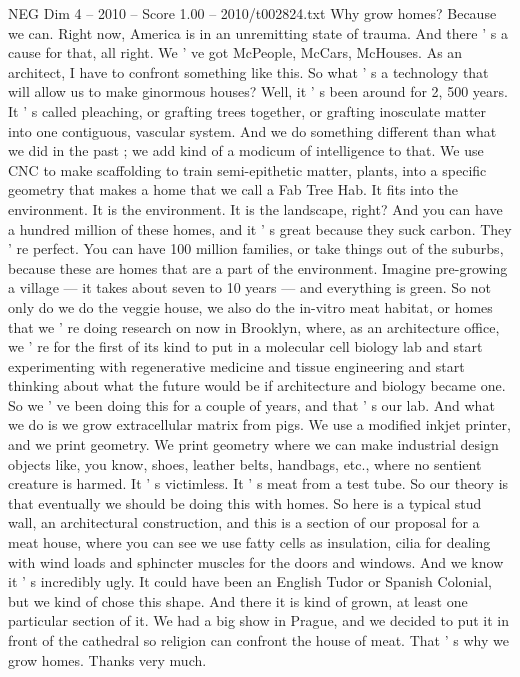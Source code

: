 \begin{textsample}{NEG Dim 4 – 2010 – Score 1.00 – 2010/t002824.txt}  \label{ex:f4_neg_022}
Why grow homes?
Because we can.
Right now, America is in an unremitting state of trauma.
And there ' s a cause for that, all right.
We ' ve got McPeople, McCars, McHouses.
As an architect, I have to confront something like this.
So what ' s a technology that will allow us to make ginormous houses?
Well, it ' s been around for 2, 500 years.
It ' s called pleaching, or grafting trees together, or grafting inosculate matter into one contiguous, vascular system.
And we do something different than what we did in the past ; we add kind of a modicum of intelligence to that.
We use CNC to make scaffolding to train semi-epithetic matter, plants, into a specific geometry that makes a home that we call a Fab Tree Hab.
It fits into the environment.
It is the environment.
It is the landscape, right?
And you can have a hundred million of these homes, and it ' s great because they suck carbon.
They ' re perfect.
You can have 100 million families, or take things out of the suburbs, because these are homes that are a part of the environment.
Imagine pre-growing a village — it takes about seven to 10 years — and everything is green.
So not only do we do the veggie house, we also do the in-vitro meat habitat, or homes that we ' re doing research on now in Brooklyn, where, as an architecture office, we ' re for the first of its kind to put in a molecular cell biology lab and start experimenting with regenerative medicine and tissue engineering and start thinking about what the future would be if architecture and biology became one.
So we ' ve been doing this for a couple of years, and that ' s our lab.
And what we do is we grow extracellular matrix from pigs.
We use a modified inkjet printer, and we print geometry.
We print geometry where we can make industrial design objects like, you know, shoes, leather belts, handbags, etc., where no sentient creature is harmed.
It ' s victimless.
It ' s meat from a test tube.
So our theory is that eventually we should be doing this with homes.
So here is a typical stud wall, an architectural construction, and this is a section of our proposal for a meat house, where you can see we use fatty cells as insulation, cilia for dealing with wind loads and sphincter muscles for the doors and windows.
And we know it ' s incredibly ugly.
It could have been an English Tudor or Spanish Colonial, but we kind of chose this shape.
And there it is kind of grown, at least one particular section of it.
We had a big show in Prague, and we decided to put it in front of the cathedral so religion can confront the house of meat.
That ' s why we grow homes.
Thanks very much.

\end{textsample}
